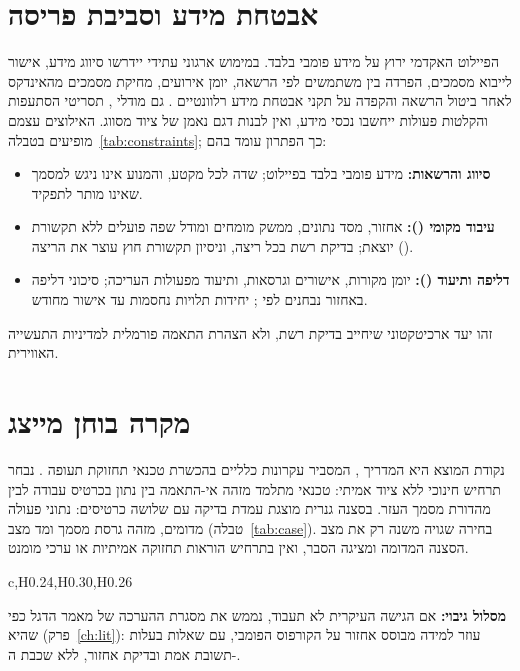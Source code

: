 \section{אבטחת מידע וסביבת פריסה}\label{sec:solsec}
הפיילוט האקדמי ירוץ על מידע פומבי בלבד. במימוש ארגוני עתידי יידרשו סיווג מידע, אישור לייבוא מסמכים, הפרדה בין משתמשים לפי הרשאה, יומן אירועים, מחיקת
מסמכים מהאינדקס לאחר ביטול הרשאה והקפדה על תקני אבטחת מידע רלוונטיים \cite{iso27001}. גם מודלי , תסריטי הסתעפות והקלטות פעולות ייחשבו נכסי מידע,
ואין לבנות דגם נאמן של ציוד מסווג. האילוצים עצמם מופיעים בטבלה~\ref{tab:constraints}; כך הפתרון עומד בהם:
\begin{itemize}[nosep]
  \item \textbf{סיווג והרשאות:} מידע פומבי בלבד בפיילוט; שדה \texttt{} לכל מקטע, והמנוע אינו ניגש למסמך שאינו מותר לתפקיד.
  \item \textbf{עיבוד מקומי ():} אחזור, מסד נתונים, ממשק מומחים ומודל שפה פועלים ללא תקשורת יוצאת; בדיקת רשת בכל ריצה, וניסיון תקשורת חוץ עוצר את הריצה ().
  \item \textbf{דליפה ותיעוד ():} יומן מקורות, אישורים וגרסאות, ותיעוד  מפעולות העריכה; סיכוני דליפה באחזור נבחנים לפי \cite{zeng2024good}; יחידות תלויות נחסמות עד אישור מחודש.
\end{itemize}
זהו יעד ארכיטקטוני שיחייב בדיקת רשת, ולא הצהרת התאמה פורמלית למדיניות התעשייה האווירית.

\section{מקרה בוחן מייצג}\label{sec:solcase}
נקודת המוצא היא המדריך , המסביר עקרונות כלליים בהכשרת טכנאי תחזוקת תעופה \cite{faa2023amt}. נבחר תרחיש חינוכי ללא ציוד אמיתי:
טכנאי מתלמד מזהה אי-התאמה בין נתון בכרטיס עבודה לבין מהדורת מסמך העזר. בסצנה גנרית מוצגת עמדת בדיקה עם שלושה כרטיסים: נתוני פעולה מדומים, מזהה גרסת מסמך
ומד מצב (טבלה~\ref{tab:case}). בחירה שגויה משנה רק את מצב הסצנה המדומה ומציגה הסבר, ואין בתרחיש הוראות תחזוקה אמיתיות או ערכי מומנט.
\begin{table}[!htbp]
\centering
\pcCompactTables
\caption{מקרה בוחן מייצג שמורץ לאורך כל השיטה}\label{tab:case}
\begin{pctable}{c,H{0.24},H{0.30},H{0.26}}
\end{pctable}
\end{table}
\textbf{מסלול גיבוי:} אם הגישה העיקרית לא תעבוד, נממש את מסגרת ההערכה של מאמר הדגל \cite{hua2025civask} כפי שהיא (פרק~\ref{ch:lit}): עוזר למידה מבוסס אחזור על הקורפוס הפומבי, עם שאלות בעלות תשובת אמת ובדיקת אחזור, ללא שכבת ה-.

